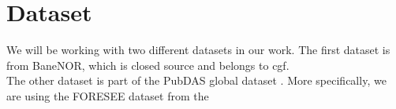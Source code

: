 \section{Dataset}
\label{meth:data}

We will be working with two different datasets in our work. The first dataset is from BaneNOR, which is closed source and belongs to \acrfull{cgf}. \\ 

The other dataset is part of the PubDAS global dataset \cite{spica2023pubdas}. More specifically, we are using the FORESEE dataset from the 



